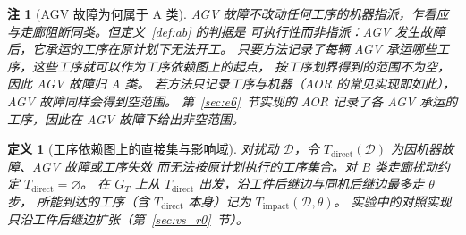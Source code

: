 \documentclass[manuscript,screen,review]{acmart}
\newtheorem{definition}{定义}
\newtheorem{remark}{注}
\begin{document}
\begin{remark}[AGV 故障为何属于 A 类]
\label{rem:agv_class}
AGV 故障不改动任何工序的机器指派，乍看应与走廊阻断同类。但定义~\ref{def:ab} 的判据是
\emph{可执行性}而非指派：AGV 发生故障后，它承运的工序在原计划下无法开工。
只要方法记录了每辆 AGV 承运哪些工序，这些工序就可以作为工序依赖图上的起点，
按工序划界得到的范围不为空，因此 AGV 故障归 A 类。
若方法只记录工序与机器（AOR 的常见实现即如此），AGV 故障同样会得到空范围。
第~\ref{sec:e6}~节实现的 AOR 记录了各 AGV 承运的工序，因此在 AGV 故障下给出非空范围。
\end{remark}

\begin{definition}[工序依赖图上的直接集与影响域]
\label{def:task_impact}
对扰动 \(\mathcal{D}\)，令 \(T_{\mathrm{direct}}(\mathcal{D})\) 为因机器故障、AGV 故障或工序失效
而无法按原计划执行的工序集合。对 B 类走廊扰动约定 \(T_{\mathrm{direct}}=\varnothing\)。
在 \(G_T\) 上从 \(T_{\mathrm{direct}}\) 出发，沿工件后继边与同机后继边最多走 \(\theta\) 步，
所能到达的工序（含 \(T_{\mathrm{direct}}\) 本身）记为 \(T_{\mathrm{impact}}(\mathcal{D},\theta)\)。
实验中的对照实现只沿工件后继边扩张（第~\ref{sec:vs_r0}~节）。
\end{definition}
\end{document}
